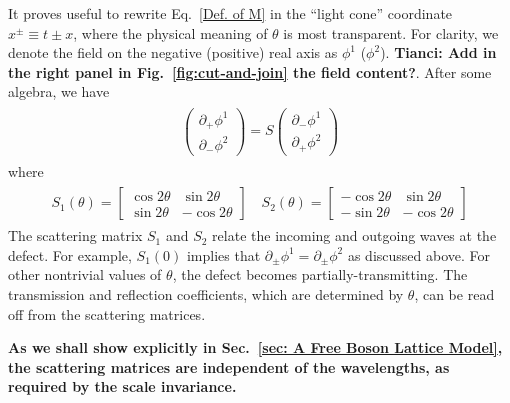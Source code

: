 It proves useful to rewrite Eq.~\eqref{Def. of M} in the ``light cone'' coordinate $x^\pm\equiv t\pm x$, where the physical meaning of $\theta$ is most transparent. For clarity, we denote the field on the negative (positive) real axis as $\phi^1$ ($\phi^2$). {\bf\color{red}Tianci: Add in the right panel in Fig.~\ref{fig:cut-and-join} the field content?}. After some algebra, we have
\begin{eqnarray}\begin{aligned}
\label{Def. of S}
\begin{pmatrix}
\partial_+\phi^1\\
\partial_-\phi^2
\end{pmatrix}
=S
\begin{pmatrix}
\partial_-\phi^1\\
\partial_+\phi^2
\end{pmatrix}
\end{aligned}\end{eqnarray}
where 
\begin{eqnarray}\begin{aligned}
S_1(\theta)=\begin{bmatrix}
\cos 2\theta & \sin 2\theta \\
\sin 2\theta & -\cos 2\theta
\end{bmatrix}\quad
S_2(\theta)=\begin{bmatrix}
-\cos 2\theta & \sin 2\theta \\
-\sin 2\theta & -\cos 2\theta
\end{bmatrix}
\end{aligned}\end{eqnarray}
The scattering matrix $S_1$ and $S_2$ relate the incoming and outgoing waves at the defect. For example, $S_1(0)$ implies that $\partial_\pm\phi^{1}=\partial_\pm\phi^{2}$ as discussed above. For other nontrivial values of $\theta$, the defect becomes partially-transmitting. The transmission and reflection coefficients, which are determined by $\theta$, can be read off from the scattering matrices.

{\bf\color{red}As we shall show explicitly in Sec.~\ref{sec: A Free Boson Lattice Model}, the scattering matrices are independent of the wavelengths, as required by the scale invariance.}
